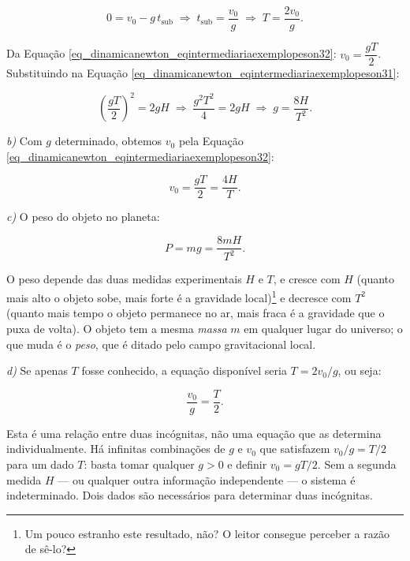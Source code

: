 \begin{exemplo}
\begin{enumerate}
\begin{equation}
      0 = v_0 - g\,t_{\text{sub}}
  \;\Longrightarrow\;
  t_{\text{sub}} = \frac{v_0}{g}
  \;\Longrightarrow\;
  T = \frac{2v_0}{g}.
  \label{eq_dinamicanewton_eqintermediariaexemplopeson32}
\end{equation}

\end{enumerate}


Da Equação \eqref{eq_dinamicanewton_eqintermediariaexemplopeson32}: $v_0 = \dfrac{gT}{2}$. Substituindo na Equação \eqref{eq_dinamicanewton_eqintermediariaexemplopeson31}:

\[
  \left(\frac{gT}{2}\right)^2 = 2gH
  \;\Longrightarrow\;
  \frac{g^2 T^2}{4} = 2gH
  \;\Longrightarrow\;
  \boxed{g = \frac{8H}{T^2}.}
\]

\medskip
\noindent\textit{b)} Com $g$ determinado, obtemos $v_0$ pela Equação \eqref{eq_dinamicanewton_eqintermediariaexemplopeson32}:

\[
  \boxed{v_0 = \frac{gT}{2} = \frac{4H}{T}.}
\]

\medskip
\noindent\textit{c)} O peso do objeto no planeta:

\[
  \boxed{P = mg = \frac{8mH}{T^2}.}
\]

\noindent O peso depende das duas medidas experimentais $H$ e $T$, e
cresce com $H$ (quanto mais alto o objeto sobe, mais forte é a
gravidade local)\footnote{Um pouco estranho este resultado, não? O leitor consegue perceber a razão de sê-lo?} e decresce com $T^2$ (quanto mais tempo o objeto
permanece no ar, mais fraca é a gravidade que o puxa de volta). O
objeto tem a mesma \emph{massa} $m$ em qualquer lugar do universo;
o que muda é o \emph{peso}, que é ditado pelo campo gravitacional
local.

\medskip
\noindent\textit{d)} Se apenas $T$ fosse conhecido, a equação
disponível seria $T = 2v_0/g$, ou seja:

\[
  \frac{v_0}{g} = \frac{T}{2}.
\]

\noindent Esta é uma relação entre duas incógnitas, não uma equação
que as determina individualmente. Há infinitas combinações de $g$ e
$v_0$ que satisfazem $v_0/g = T/2$ para um dado $T$: basta tomar
qualquer $g > 0$ e definir $v_0 = gT/2$. Sem a segunda medida $H$
--- ou qualquer outra informação independente --- o sistema é
indeterminado. Dois dados são necessários para determinar duas
incógnitas.



\end{exemplo}




